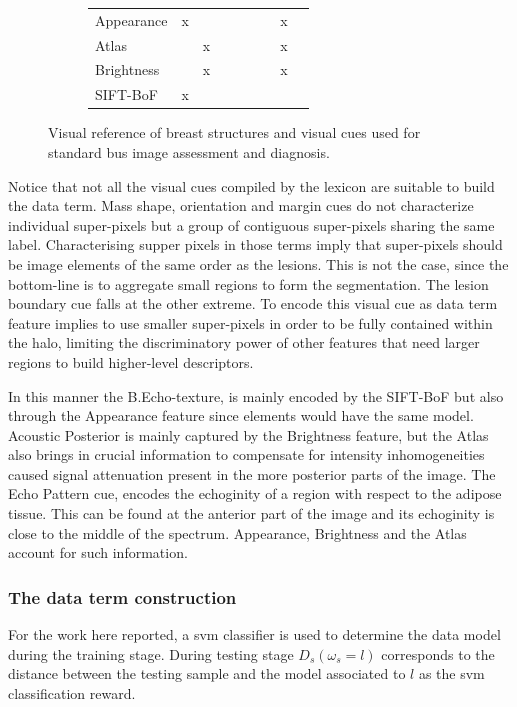 \begin{figure}
\begin{subfigure}[b]{\textwidth}
\begin{tabular}{lcccccccc}
       Appearance & x &   &  &  &  &  & x & \\
       Atlas      &   & x &  &  &  &  & x & \\
       Brightness &   & x &  &  &  &  & x & \\
       SIFT-BoF   & x &   &  &  &  &  &   & \\
      \end{tabular}
      \label{fig:features:relation}
    \end{subfigure}
    \caption {{\small Visual reference of breast structures and visual cues used for standard \ac{bus} image assessment and diagnosis.}} 
    \label{fig:features}
\end{figure}

Notice that not all the visual cues compiled by the lexicon are suitable to build the data term.
Mass shape, orientation and margin cues do not characterize individual super-pixels but a group of contiguous super-pixels sharing the same label.
Characterising supper pixels in those terms imply that super-pixels should be image elements of the same order as the lesions. 
This is not the case, since the bottom-line is to aggregate small regions to form the segmentation.
The lesion boundary cue falls at the other extreme.
To encode this visual cue as data term feature implies to use smaller super-pixels in order to be fully contained within the halo, limiting the discriminatory power of other features that need larger regions to build higher-level descriptors.

In this manner the B.Echo-texture, is mainly encoded by the SIFT-BoF but also through the Appearance feature since elements would have the same model.
Acoustic Posterior is mainly captured by the Brightness feature, but the Atlas also brings in crucial information to compensate for intensity inhomogeneities caused signal attenuation present in the more posterior parts of the image.
The Echo Pattern cue, encodes the echoginity of a region with respect to the adipose tissue. This can be found at the anterior part of the image and its echoginity is close to the middle of the spectrum. Appearance, Brightness and the Atlas account for such information.

\subsubsection{The data term construction}
For the work here reported, a \ac{svm} classifier is used to determine the data model during the training stage.
During testing stage $D_s(\omega_s=l)$ corresponds to the distance between the testing sample and the model associated to $l$ as the \ac{svm} classification reward. 

